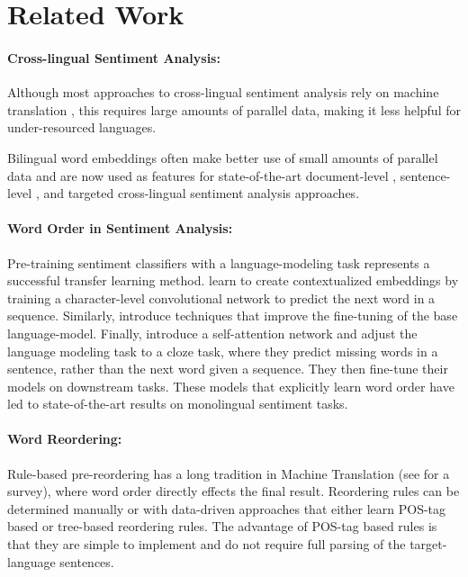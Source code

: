 \documentclass[a4paper,11pt,twocolumn,twoside]{article}
\begin{document}
\section{Related Work}

\paragraph{Cross-lingual Sentiment Analysis: }

Although most approaches to cross-lingual sentiment analysis rely on machine translation \cite{Banea2008,Balahur2014d,Klinger2015}, this requires large amounts of parallel data,
making it less helpful for under-resourced languages.


Bilingual word embeddings \cite{Mikolov2013translation,Artetxe2017,Lample2017} often make 
better use of small amounts of parallel data and are now used as features for state-of-the-art document-level \cite{Chen2016}, sentence-level \cite{Barnes2018b}, and targeted \cite{Hangya2018} cross-lingual sentiment analysis approaches.


\paragraph{Word Order in Sentiment Analysis: }

Pre-training sentiment classifiers with a language-modeling task represents a successful transfer learning method.  learn
to create contextualized embeddings by training a character-level convolutional
network to predict the next word in a sequence. Similarly,  introduce techniques that improve the fine-tuning of the base language-model. Finally, 
 introduce a self-attention network and adjust the language
modeling task to a cloze task, where they predict missing words in a sentence, rather than the next word given a sequence. They then fine-tune their models on downstream tasks. These models that explicitly learn word order have led to state-of-the-art results on monolingual sentiment tasks.

\paragraph{Word Reordering: }

Rule-based pre-reordering has a long tradition in Machine Translation (see  for a survey), where word order directly effects the final result. Reordering rules can be determined manually \cite{Collins2005,Gojun2012} or with data-driven approaches that either learn POS-tag based \cite{Crego2006,Crego2006b} or tree-based \cite{Neubig2012,Nakagawa2015} reordering rules. The advantage of POS-tag based rules is that they are simple to implement and do not require full parsing of the target-language sentences.
\end{document}
